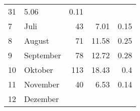 \begin{longtable}{lXrrr}
       \num{31} &
       \num[round-mode=places,round-precision=2]{5,06} &
         \num[round-mode=places,round-precision=2]{0,11} \\

     7 &
     \multicolumn{1}{X}{ Juli   } &


       \num{43} &
       \num[round-mode=places,round-precision=2]{7,01} &
         \num[round-mode=places,round-precision=2]{0,15} \\

     8 &
     \multicolumn{1}{X}{ August   } &


       \num{71} &
       \num[round-mode=places,round-precision=2]{11,58} &
         \num[round-mode=places,round-precision=2]{0,25} \\

     9 &
     \multicolumn{1}{X}{ September   } &


       \num{78} &
       \num[round-mode=places,round-precision=2]{12,72} &
         \num[round-mode=places,round-precision=2]{0,28} \\

     10 &
     \multicolumn{1}{X}{ Oktober   } &


       \num{113} &
       \num[round-mode=places,round-precision=2]{18,43} &
         \num[round-mode=places,round-precision=2]{0,4} \\

     11 &
     \multicolumn{1}{X}{ November   } &


       \num{40} &
       \num[round-mode=places,round-precision=2]{6,53} &
         \num[round-mode=places,round-precision=2]{0,14} \\

     12 &
     \multicolumn{1}{X}{ Dezember   } &



\end{longtable}

